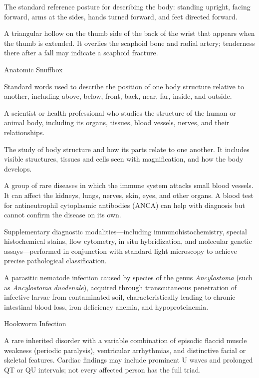  The standard reference posture for describing the body: standing upright, facing forward, arms at the sides, hands turned forward, and feet directed forward.

 A triangular hollow on the thumb side of the back of the wrist that appears when the thumb is extended. It overlies the scaphoid bone and radial artery; tenderness there after a fall may indicate a scaphoid fracture.

\synonyms
Anatomic Snuffbox

 Standard words used to describe the position of one body structure relative to another, including above, below, front, back, near, far, inside, and outside.

 A scientist or health professional who studies the structure of the human or animal body, including its organs, tissues, blood vessels, nerves, and their relationships.

 The study of body structure and how its parts relate to one another. It includes visible structures, tissues and cells seen with magnification, and how the body develops.

 A group of rare diseases in which the immune system attacks small blood vessels. It can affect the kidneys, lungs, nerves, skin, eyes, and other organs. A blood test for antineutrophil cytoplasmic antibodies (ANCA) can help with diagnosis but cannot confirm the disease on its own.

 Supplementary diagnostic modalities—including immunohistochemistry, special histochemical stains, flow cytometry, in situ hybridization, and molecular genetic assays—performed in conjunction with standard light microscopy to achieve precise pathological classification.

 A parasitic nematode infection caused by species of the genus \textit{Ancylostoma} (such as \textit{Ancylostoma duodenale}), acquired through transcutaneous penetration of infective larvae from contaminated soil, characteristically leading to chronic intestinal blood loss, iron deficiency anemia, and hypoproteinemia.

\synonyms
Hookworm Infection

 A rare inherited disorder with a variable combination of episodic flaccid muscle weakness (periodic paralysis), ventricular arrhythmias, and distinctive facial or skeletal features. Cardiac findings may include prominent U waves and prolonged QT or QU intervals; not every affected person has the full triad.

